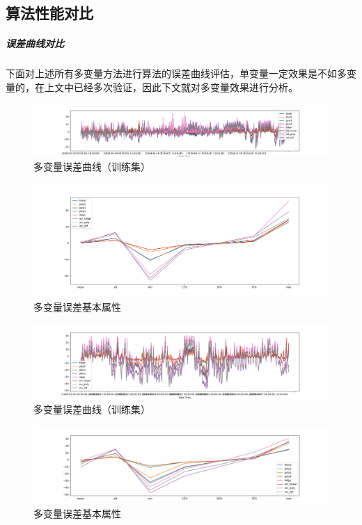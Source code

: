 \documentclass{ctexart}
\begin{document}
\subsection{算法性能对比}
\subparagraph{误差曲线对比} 下面对上述所有多变量方法进行算法的误差曲线评估，单变量一定效果是不如多变量的，在上文中已经多次验证，因此下文就对多变量效果进行分析。
\begin{figure}[H]
	\includegraphics[width=1.2\textwidth]{../images/e1.png}
	\caption{多变量误差曲线（训练集）}
\end{figure}
\begin{figure}[H]
	\includegraphics[width=1.2\textwidth]{../images/e3.png}
	\caption{多变量误差基本属性}
\end{figure}
\begin{figure}[H]
	\includegraphics[width=1.2\textwidth]{../images/e2.png}
	\caption{多变量误差曲线（训练集）}
\end{figure}
\begin{figure}[H]
	\includegraphics[width=1.2\textwidth]{../images/e4.png}
	\caption{多变量误差基本属性}
\end{figure}
\end{document}
